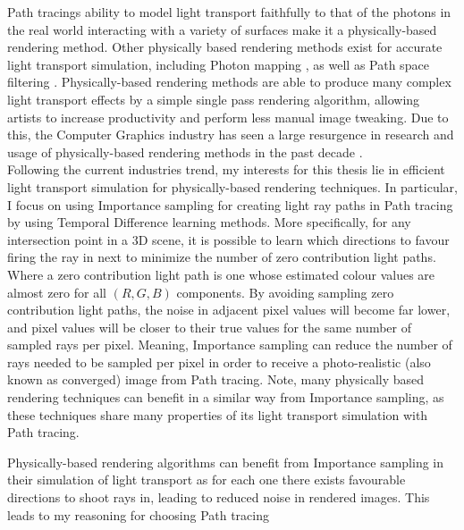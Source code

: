 \documentclass[ %
                    author={Callum Pearce},
                supervisor={Dr. Neill Campbell},
                    degree={MEng},
                     title={How effective are Temporal difference learning methods for reducing the number of zero contribution light paths while still accurately approximating Global Illumination in Path tracing?},
                  subtitle={},
                      type={research},
                      year={2019} ]{dissertation}
\begin{document}
Path tracings ability to model light transport faithfully to that of the photons in 
the real world interacting with a variety of surfaces make it a physically-based
rendering method. Other physically based rendering methods exist for accurate
light transport simulation, including Photon mapping \cite{jensen1996global}, as
well as Path space filtering \cite{keller2016path}. Physically-based rendering 
methods are able to produce many complex light transport effects by a simple 
single pass rendering algorithm, allowing artists to increase productivity and 
perform less manual image tweaking. Due to this, the Computer Graphics industry
has seen a large resurgence in research and usage of physically-based rendering 
methods in the past decade \cite{krivanek2014recent}. \\

Following the current industries trend, my interests for this thesis lie in efficient 
light transport simulation for physically-based rendering techniques. In particular, 
I focus on using Importance sampling for creating light ray paths in Path tracing by 
using Temporal Difference learning methods. More specifically, for any intersection
point in a 3D scene, it is possible to learn which directions to favour firing the ray in 
next to minimize the number of zero contribution light paths. Where a zero
contribution light path is one whose estimated colour values are almost zero for all
$(R,G,B)$ components. By avoiding sampling zero contribution light paths, the noise
in adjacent pixel values will become far lower, and pixel values will be closer to
their true values for the same number of sampled rays per pixel. Meaning, Importance
sampling can reduce the number of rays needed to be sampled per pixel in order to
receive a photo-realistic (also known as converged) image from Path tracing. Note, 
many physically based rendering techniques can benefit in a similar way \cite{} from 
Importance sampling, as these techniques share many properties of its light 
transport simulation with Path tracing.


Physically-based rendering algorithms  can benefit  from Importance sampling in their simulation of light transport as for each one there exists favourable directions to shoot rays in, leading to 
reduced noise in rendered images. This leads to my reasoning for choosing
Path tracing 
\end{document}
